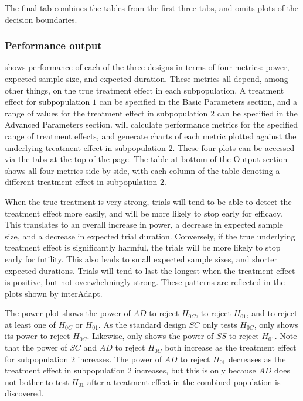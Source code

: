 \documentclass[article]{jss}
\begin{document}
The final tab combines the tables from the first three tabs, and omits plots of the decision boundaries.


\subsubsection{Performance output}
\label{sub:performance-output}

 shows performance of each of the three designs in terms of four metrics: power, expected sample size, and expected duration. These metrics all depend, among other things, on the true treatment effect in each subpopulation. A treatment effect for subpopulation $1$ can be specified in the Basic Parameters section, and a range of values for the treatment effect in subpopulation $2$ can be specified in the Advanced Parameters section. %
  will calculate performance metrics for the specified range of treatment effects, and generate charts of each metric plotted against the underlying treatment effect in subpopulation $2$. These four plots can be accessed via the tabs at the top of the page. The table at bottom of the Output section shows all four metrics side by side, with each column of the table denoting a different treatment effect in subpopulation $2$.%

When the true treatment is very strong, trials will tend to be able to detect the treatment effect more easily, and will be more likely to stop early for efficacy. This translates to an overall increase in power, a decrease in expected sample size, and a decrease in expected trial duration. Conversely, if the true underlying treatment effect is significantly harmful, the trials will be more likely to stop early for futility. This also leads to small expected sample sizes, and shorter expected durations. Trials will tend to last the longest when the treatment effect is positive, but not overwhelmingly strong. These patterns are reflected in the plots shown by \textsf{interAdapt}.

The power plot shows the power of $AD$ to reject $H_{0C}$, to reject $H_{01}$, and to reject at least one of $H_{0C}$ or $H_{01}$. As the standard design $SC$ only tests $H_{0C}$,  only shows its power to reject $H_{0C}$. Likewise,  only shows the power of $SS$ to reject $H_{01}$. Note that the power of $SC$ and $AD$ to reject $H_{0C}$ both increase as the treatment effect for subpopulation $2$ increases. The power of $AD$ to reject $H_{01}$ decreases as the treatment effect in subpopulation $2$ increases, but this is only because $AD$ does not bother to test $H_{01}$ after a treatment effect in the combined population is discovered.
\end{document}
